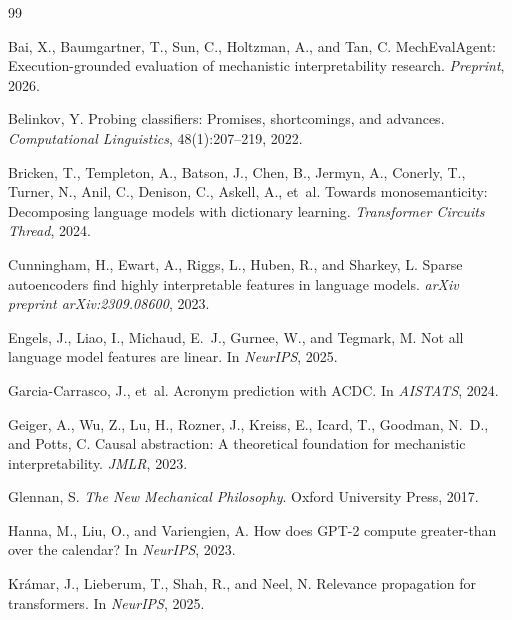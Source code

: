 \documentclass[10pt]{article}
\begin{document}
\begin{thebibliography}{99}

Bai, X., Baumgartner, T., Sun, C., Holtzman, A., and Tan, C.
\newblock MechEvalAgent: Execution-grounded evaluation of mechanistic interpretability research.
\newblock \emph{Preprint}, 2026.

Belinkov, Y.
\newblock Probing classifiers: Promises, shortcomings, and advances.
\newblock \emph{Computational Linguistics}, 48(1):207--219, 2022.

Bricken, T., Templeton, A., Batson, J., Chen, B., Jermyn, A., Conerly, T., Turner, N., Anil, C., Denison, C., Askell, A., et~al.
\newblock Towards monosemanticity: Decomposing language models with dictionary learning.
\newblock \emph{Transformer Circuits Thread}, 2024.

Cunningham, H., Ewart, A., Riggs, L., Huben, R., and Sharkey, L.
\newblock Sparse autoencoders find highly interpretable features in language models.
\newblock \emph{arXiv preprint arXiv:2309.08600}, 2023.

Engels, J., Liao, I., Michaud, E.~J., Gurnee, W., and Tegmark, M.
\newblock Not all language model features are linear.
\newblock In \emph{NeurIPS}, 2025.

Garcia-Carrasco, J., et~al.
\newblock Acronym prediction with ACDC.
\newblock In \emph{AISTATS}, 2024.

Geiger, A., Wu, Z., Lu, H., Rozner, J., Kreiss, E., Icard, T., Goodman, N.~D., and Potts, C.
\newblock Causal abstraction: A theoretical foundation for mechanistic interpretability.
\newblock \emph{JMLR}, 2023.

Glennan, S.
\newblock \emph{The New Mechanical Philosophy}.
\newblock Oxford University Press, 2017.

Hanna, M., Liu, O., and Variengien, A.
\newblock How does {GPT}-2 compute greater-than over the calendar?
\newblock In \emph{NeurIPS}, 2023.

Kr{\'a}mar, J., Lieberum, T., Shah, R., and Neel, N.
\newblock Relevance propagation for transformers.
\newblock In \emph{NeurIPS}, 2025.


\end{thebibliography}
\end{document}
